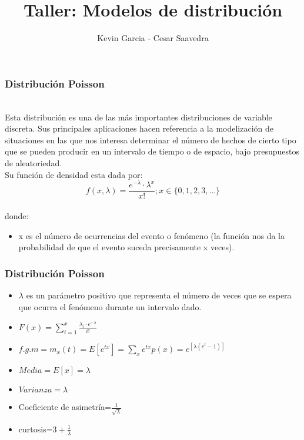 \documentclass[12pt]{beamer}
\author{Kevin Garcia - Cesar Saavedra}
\title{Taller: Modelos de distribución}
\begin{document}
\begin{frame}
\titlepage
\end{frame}

\begin{frame}
\frametitle{Distribución Poisson}
~\\  Esta distribución es una de las más importantes distribuciones de variable discreta. Sus principales aplicaciones hacen referencia a la modelización de situaciones en las que nos interesa determinar el número de hechos de cierto tipo que se pueden producir en un intervalo de tiempo o de espacio, bajo presupuestos de aleatoriedad.
~\\ Su función de densidad esta dada por: 
~\\$$f(x,\lambda)=\frac{e^{-\lambda}\cdot \lambda^x}{x!}  ; x \in \{0,1,2,3,...\}$$
~\\donde:
\begin{itemize} 
\item x es el número de ocurrencias del evento o fenómeno (la función nos da la probabilidad de que el evento suceda precisamente x veces).
\end{itemize}
\end{frame}

\begin{frame}
\frametitle{Distribución Poisson}
\begin{itemize}
\item $\lambda$ es un parámetro positivo que representa el número de veces que se espera que ocurra el fenómeno durante un intervalo dado.
\item $F(x)=\sum\limits_{i=1}^{x} \frac{\lambda_{i}\cdot e^{-\lambda}}{i!}$
\item $f.g.m=m_{x}(t)=E[e^{tx}]=\sum\limits_{x} e^{tx}p(x)= e^{[\lambda(e^t-1)]}$
\item $Media=E[x]=\lambda$
\item $Varianza=\lambda$
\item Coeficiente de asimetría=$\frac{1}{\sqrt{\lambda}}$
\item curtosis=$3+\frac{1}{\lambda}$
\end{itemize}
\end{frame}
\end{document}
